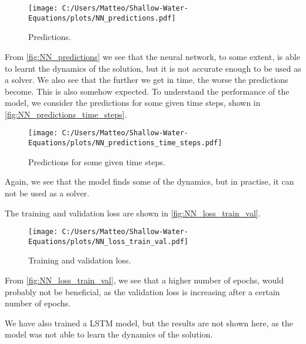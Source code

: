 \begin{figure}[H]
    \centering
    \texttt{[image: C:/Users/Matteo/Shallow-Water-Equations/plots/NN\_predictions.pdf]}
    \caption{Predictions.}\label{fig:NN_predictions}
\end{figure}
From \autoref{fig:NN_predictions} we see that the neural network, to some extent, is able to learnt the dynamics of the solution, but it is not accurate enough to be used as a solver.
We also see that the further we get in time, the worse the predictions become. This is also somehow expected.
To understand the performance of the model, we consider the predictions for some given time steps, shown in \autoref{fig:NN_predictions_time_steps}.
\begin{figure}[H]
    \centering
    \texttt{[image: C:/Users/Matteo/Shallow-Water-Equations/plots/NN\_predictions\_time\_steps.pdf]}
    \caption{Predictions for some given time steps.}\label{fig:NN_predictions_time_steps}
\end{figure}
Again, we see that the model finds some of the dynamics, but in practise, it can not be used as a solver.

The training and validation loss are shown in \autoref{fig:NN_loss_train_val}.
\begin{figure}[H]
    \centering
    \texttt{[image: C:/Users/Matteo/Shallow-Water-Equations/plots/NN\_loss\_train\_val.pdf]}
    \caption{Training and validation loss.}\label{fig:NN_loss_train_val}
\end{figure}
From \autoref{fig:NN_loss_train_val}, we see that a higher number of epochs, would probably not be beneficial, as the validation loss is increasing after a certain number of epochs.

We have also trained a LSTM model, but the results are not shown here, as the model was not able to learn the dynamics of the solution.



